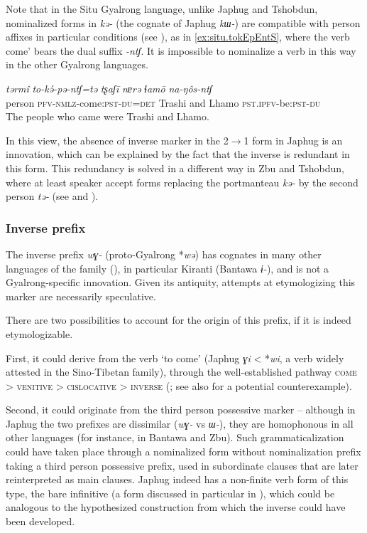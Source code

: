 \documentclass[oneside,a4paper,11pt]{article}
\newcommand{\ipa}[1]{\mbox{\phon\textit{#1}}} %
\begin{document}
Note that in the Situ Gyalrong language, unlike Japhug and Tshobdun, nominalized forms in \ipa{kə-} (the cognate of Japhug \ipa{kɯ-}) are compatible with person affixes in particular conditions (see \citealt[11-12]{jacksonlin07}), as in \ref{ex:situ.tokEpEntS}, where the verb  come' bears the dual suffix \ipa{-ntʃ}. It is impossible to nominalize a verb in this way in the other Gyalrong languages.

 \begin{exe}
\ex \label{ex:situ.tokEpEntS}
\gll
\ipa{tərmî}  	\ipa{to-kə́-pə-ntʃ=tə}  	\ipa{tʂaʃī}  	\ipa{nɐrə}  	\ipa{ɬamō}  	\ipa{na-ŋôs-ntʃ}  	\\
person \textsc{pfv-nmlz}-come:\textsc{pst}-\textsc{du=det} Trashi and Lhamo \textsc{pst.ipfv}-be:\textsc{pst}-\textsc{du} \\
\glt The people who came were Trashi and Lhamo.
  \end{exe}

In this view, the absence of inverse marker in the  2$\rightarrow$1 form in Japhug is an innovation, which can be explained by the fact that the inverse is redundant in this form. This redundancy is solved in a different way in Zbu and Tshobdun, where at least speaker accept forms replacing the portmanteau \ipa{kə-} by the second person \ipa{tə-} (see \citealt{jackson02rentongdengdi} and \citealt{gongxun14agreement}).



 \subsubsection{Inverse prefix}
The inverse prefix \ipa{wɣ-} (proto-Gyalrong *\ipa{wə}) has cognates in many other languages of the family (\citealt{jacques12agreement}), in particular Kiranti (Bantawa \ipa{ɨ-}), and is not a Gyalrong-specific innovation. Given its antiquity, attempts at etymologizing this marker are necessarily speculative. 

There are two possibilities to account for the origin of this prefix, if it is indeed etymologizable. 

First, it could derive from the verb `to come' (Japhug \ipa{ɣi} < *\ipa{wi}, a verb widely attested in the Sino-Tibetan family), through the well-established pathway \textsc{come} > \textsc{venitive} > \textsc{cislocative} > \textsc{inverse} (\citealt{jacques14inverse}; see also \citealt{konnerth15cisloc} for a potential counterexample).

Second, it could originate from the third person possessive marker -- although in Japhug the two prefixes are dissimilar (\ipa{wɣ-} vs \ipa{ɯ-}), they are homophonous in all other languages (for instance, in Bantawa and Zbu). Such grammaticalization could have taken place through a nominalized form without nominalization prefix taking a third person possessive prefix, used in subordinate clauses that are later reinterpreted as main clauses.  Japhug indeed has a non-finite verb form of this type, the bare infinitive (a form discussed in particular in \citealt{jacques14antipassive}), which could be analogous to the hypothesized construction from which the inverse could have been developed.
\end{document}
